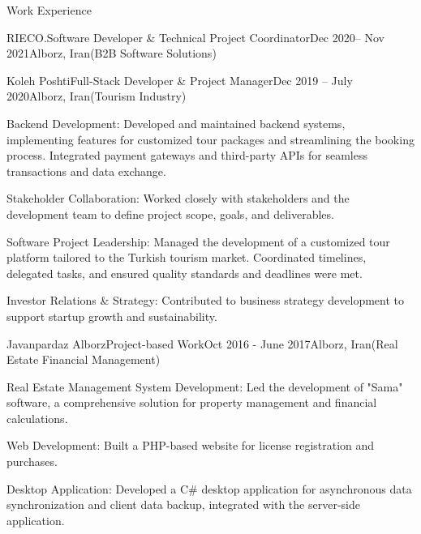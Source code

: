\documentclass[]{kyvernitis-resume}
\begin{document}
\begin{section}{Work Experience}
\begin{subsection}{RIECO.}{Software Developer  \& Technical Project Coordinator}{Dec 2020-- Nov 2021}{Alborz, Iran}{(B2B Software Solutions)}
    \end{subsection}
    
    \begin{subsection}{Koleh Poshti}{Full-Stack Developer \& Project Manager}{Dec 2019 -- July 2020}{Alborz, Iran}{(Tourism Industry)}

        	\item Backend Development: Developed and maintained backend systems, implementing features for customized tour packages and streamlining the booking process. Integrated payment gateways and third-party APIs for seamless transactions and data exchange.
        	\item Stakeholder Collaboration: Worked closely with stakeholders and the development team to define project scope, goals, and deliverables.
        	\item Software Project Leadership: Managed the development of a customized tour platform tailored to the Turkish tourism market. Coordinated timelines, delegated tasks, and ensured quality standards and deadlines were met.
        	\item Investor Relations \& Strategy: Contributed to business strategy development to support startup growth and sustainability.	
    \end{subsection}


    \begin{subsection}{Javanpardaz Alborz}{Project-based Work}{Oct 2016 - June 2017}{Alborz, Iran}{(Real Estate Financial Management)}
	\item Real Estate Management System Development: Led the development of "Sama" software, a comprehensive solution for property management and financial calculations.
	\item Web Development: Built a PHP-based website for license registration and purchases.
	\item Desktop Application: Developed a C\# desktop application for asynchronous data synchronization and client data backup, integrated with the server-side application.

    \end{subsection}



\end{section}
\end{document}
